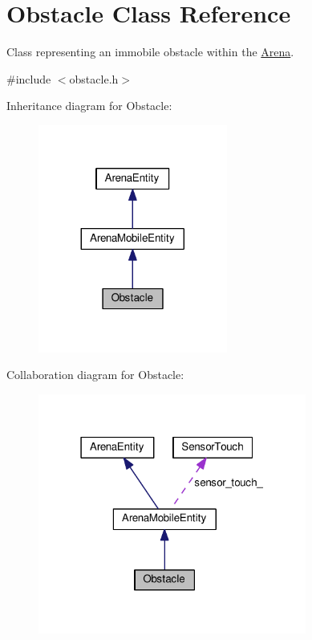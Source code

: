\hypertarget{classObstacle}{}\section{Obstacle Class Reference}
\label{classObstacle}


Class representing an immobile obstacle within the \hyperlink{classArena}{Arena}.  




{\ttfamily \#include $<$obstacle.\+h$>$}



Inheritance diagram for Obstacle\+:\nopagebreak
\begin{figure}[H]
\begin{center}
\leavevmode
\includegraphics[width=176pt]{classObstacle__inherit__graph}
\end{center}
\end{figure}


Collaboration diagram for Obstacle\+:\nopagebreak
\begin{figure}[H]
\begin{center}
\leavevmode
\includegraphics[width=250pt]{classObstacle__coll__graph}
\end{center}
\end{figure}
